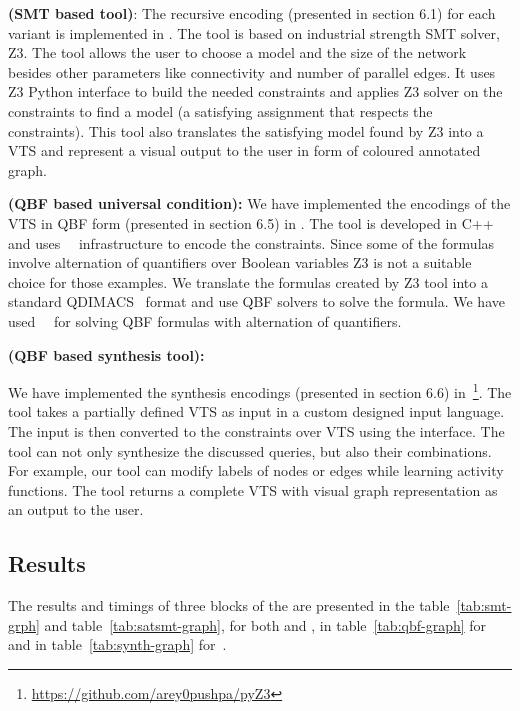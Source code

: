 \textbf{{\smttool} (SMT based tool)}:
The recursive encoding (presented in section 6.1)  
for each variant is implemented in {\smttool}.
%
The tool is based on industrial strength SMT solver, Z3. 
%
The tool allows the user to choose a model and the size
of the network besides other parameters like connectivity and number of parallel edges. 
%		
It uses Z3 Python interface to build the needed constraints and applies Z3 solver on the constraints to find a model (a satisfying assignment that respects the constraints). 
%
This tool also translates the satisfying model found by Z3 into
a VTS and represent a visual output to the user in form of coloured annotated graph. 
%
%
 

\textbf{{\qbftool} (QBF based universal condition):}
We have implemented the encodings of the VTS in QBF form (presented in section 6.5) in
{\qbftool}. 
%
The tool is developed in C++ and uses~\zthree~\cite{z3} infrastructure to encode the constraints.
%
Since some of the formulas involve alternation of quantifiers over Boolean variables Z3 is not a suitable choice for those examples.
%
We translate the formulas created by Z3 tool into a standard
QDIMACS~\cite{qdimacs} format and use QBF solvers to solve the formula. 
%
We have used~\depqbf~\cite{lonsing2010depqbf} for solving QBF formulas with alternation of quantifiers. 

\textbf{{\ourtool} (QBF based synthesis tool):}

We have implemented the synthesis encodings (presented in section 6.6) in~\ourtool\footnote{{\url{https://github.com/arey0pushpa/pyZ3}}}.
%
The tool takes a partially defined VTS as input in a custom designed
input language.
%
The input is then converted to the constraints over VTS using the {\qbftool} interface. 
%
The tool can not only synthesize the discussed queries, but also their
combinations.
%
For example, our tool can modify labels of nodes or edges while
learning activity functions.
%
The tool returns a complete VTS with visual graph representation as an output to the user.  

\subsection{Results}
The results and timings of three blocks of the {\vtstool} are presented in the table~\ref{tab:smt-grph} and table~\ref{tab:satsmt-graph}, for both {\sattool} and {\smttool}, in table~\ref{tab:qbf-graph} for {\sattool} and in table~\ref{tab:synth-graph} for~{\ourtool}.


